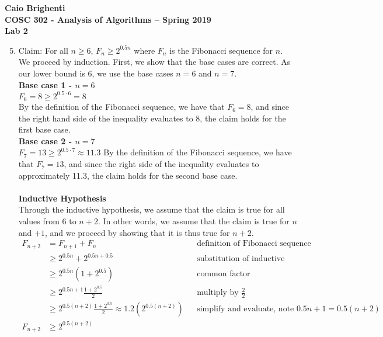 \documentclass{article}
\begin{document}
\noindent \textbf{Caio Brighenti }\\
\noindent \textbf{COSC 302 - Analysis of Algorithms -- Spring 2019}\\%
\noindent \textbf{Lab 2}\vspace{1em}\\
\begin{enumerate}
\setcounter{enumi}{4}
\item Claim: For all $n\geq 6$, $F_n\geq 2^{0.5n}$ where $F_n$ is the Fibonacci sequence for $n$.
\\ We proceed by induction. First, we show that the base cases are correct. As our lower bound is 6, we use the base cases $n=6$ and $n=7$.
\\ \textbf{Base case 1 - $n=6$} \\
$F_6 = 8 \geq 2^{0.5\cdot 6}= 8$ \\
By the definition of the Fibonacci sequence, we have that $F_6 = 8$, and since the right hand side of the inequality evaluates to 8, the claim holds for the first base case.
\\ \textbf{Base case 2 - $n=7$} \\
$F_7 = 13 \geq 2^{0.5\cdot 7}\approx 11.3 $
By the definition of the Fibonacci sequence, we have that $F_7 = 13$, and since the right side of the inequality evaluates to approximately 11.3, the claim holds for the second base case. \\
\\
\textbf{Inductive Hypothesis}
\\ Through the inductive hypothesis, we assume that the claim is true for all values from 6 to $n+2$. In other words, we assume that the claim is true for $n$ and $+1$, and we proceed by showing that it is thus true for $n+2$.
\begin{align}
	F_{n+2} &= F_{n+1} + F_n && \text{definition of Fibonacci sequence} \\
	&\geq 2^{0.5n} + 2^{0.5n+0.5} && \text{substitution of inductive hypothesis} \\
	&\geq 2^{0.5n}(1+2^{0.5}) && \text{common factor} \\
	&\geq 2^{0.5n+1} \frac{1+2^{0.5}}{2} && \text{multiply by $\frac{2}{2}$} \\
	&\geq 2^{0.5(n+2)}\frac{1+2^{0.5}}{2}\approx1.2(2^{0.5(n+2)}) && \text{simplify and evaluate, note $0.5n+1 = 0.5(n+2)$} \\
	F_{n+2} &\geq 2^{0.5(n+2)} 

\end{align}
\end{enumerate}
\end{document}
